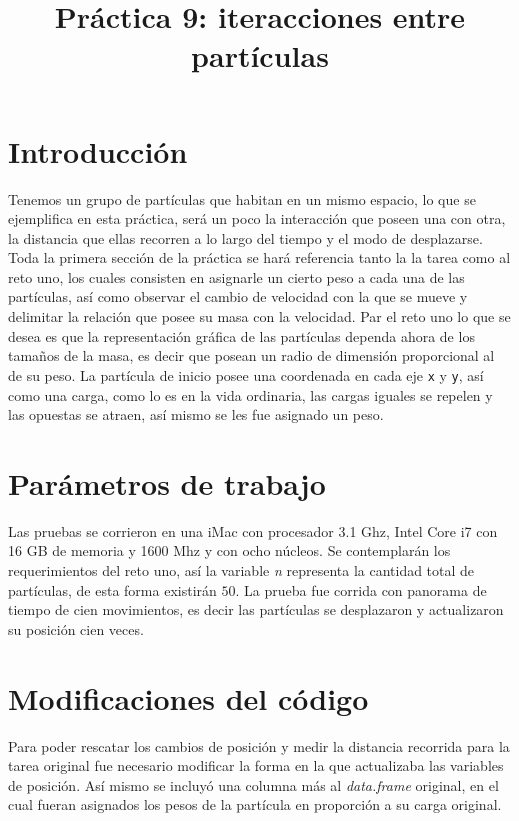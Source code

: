 \documentclass[a4paper]{article}
\title{Práctica 9: iteracciones entre partículas}
\begin{document}
\maketitle

\section{Introducci\'on}
Tenemos un grupo de partículas que habitan en un mismo espacio, lo que se ejemplifica en esta práctica, será un poco la interacción que poseen una con otra, la distancia que ellas recorren a lo largo del tiempo y el modo de desplazarse. Toda la primera sección de la práctica se hará referencia tanto la la tarea como al reto uno, los cuales consisten en asignarle un cierto peso a cada una de las partículas, así como observar el cambio de velocidad con la que se mueve y delimitar la relación que posee su masa con la velocidad. Par el reto uno lo que se desea es que la representación gráfica de las partículas dependa ahora de los tamaños de la masa, es decir que posean un radio de dimensión proporcional al de su peso. La partícula de inicio posee una coordenada en cada eje \texttt{x} y \texttt{y}, así como una carga, como lo es en la vida ordinaria, las cargas iguales se repelen y las opuestas se atraen, así mismo se les fue asignado un peso.

\section{Par\'ametros de trabajo}
Las pruebas se corrieron en una iMac con procesador 3.1 Ghz, Intel Core i7 con 16 GB de memoria y 1600 Mhz y con ocho núcleos. Se contemplarán los requerimientos del reto uno, así la variable \textit{n} representa la cantidad total de partículas, de esta forma existirán $50$. La prueba fue corrida con panorama de tiempo de cien movimientos, es decir las partículas se desplazaron y actualizaron su posición cien veces.

\section{Modificaciones del código}
Para poder rescatar los cambios de posición y medir la distancia recorrida para la tarea original fue necesario modificar la forma en la que actualizaba las variables de posición. Así mismo se incluyó una columna más al \textit{data.frame} original, en el cual fueran asignados los pesos de la partícula en proporción a su carga original.
\end{document}
